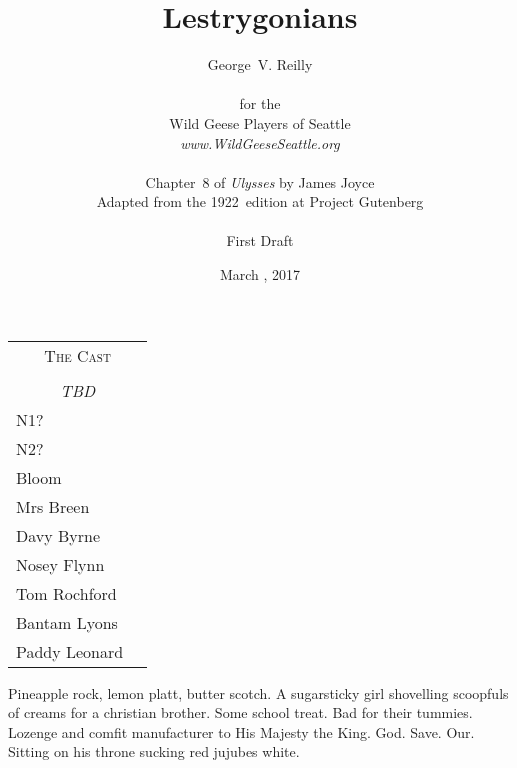 


\title{\Huge Lestrygonians}
\author{George~V. Reilly\\
\\
{\small for the}\\
Wild Geese Players of Seattle\\
{\emph{www.WildGeeseSeattle.org}}\\
\\
{\small Chapter~8 of \emph{Ulysses} by James Joyce}\\
{\small Adapted from the 1922~edition at Project Gutenberg}
\\
\\
{\small First Draft}}
\date{March , 2017}
\raggedbottom



\maketitle
\thispagestyle{empty}
\pagebreak

\begin{tabular}{lp{10cm}}
    \multicolumn{2}{c}{\Large \textsc{The Cast}} \\
\\
    \multicolumn{2}{c}{\large \textit{TBD}} \\
N1? \\
N2? \\
Bloom \\
Mrs Breen \\
Davy Byrne \\
Nosey Flynn \\
Tom Rochford \\
Bantam Lyons \\
Paddy Leonard \\
\end{tabular}

\thispagestyle{empty}
\newpage


\setcounter{page}{1}

Pineapple rock, lemon platt, butter scotch.
A sugarsticky girl shovelling scoopfuls of creams for a christian brother.
Some school treat.
Bad for their tummies.
Lozenge and comfit manufacturer to His Majesty the King.
God.
Save.
Our.
Sitting on his throne sucking red jujubes white.

